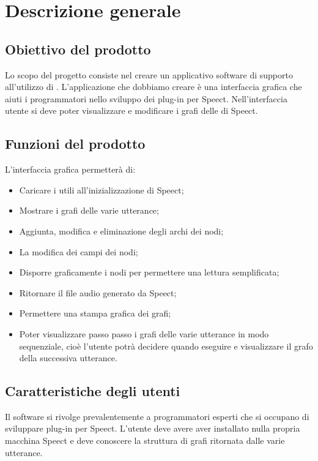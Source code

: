 \documentclass[../AnalisideiRequisiti.tex]{subfiles}
\begin{document}
	
\chapter{Descrizione generale}

\section{Obiettivo del prodotto}

Lo scopo del progetto consiste nel creare un applicativo software di supporto all’utilizzo di . L’applicazione che dobbiamo creare è una interfaccia grafica che aiuti i programmatori nello sviluppo dei plug-in per Speect. Nell’interfaccia utente si deve poter visualizzare e modificare i grafi delle  di Speect. 


\section{Funzioni del prodotto}
L’interfaccia grafica permetterà di:
\begin{itemize}
	\item{} Caricare i  utili all’inizializzazione di Speect;
	\item{} Mostrare i grafi delle varie utterance;
	\item{} Aggiunta, modifica e eliminazione degli archi dei nodi; 
	\item{} La modifica dei campi dei nodi;
	\item{} Disporre graficamente i nodi per permettere una lettura semplificata;
	\item{} Ritornare il file audio generato da Speect;
	\item{} Permettere una stampa grafica dei grafi;
	\item{} Poter visualizzare passo passo i grafi delle varie utterance in modo sequenziale, cioè l’utente potrà decidere quando eseguire e visualizzare il grafo della successiva utterance.	
\end{itemize}


\section{Caratteristiche degli utenti}
Il software si rivolge prevalentemente a programmatori esperti che si occupano di sviluppare plug-in per Speect. L’utente deve avere aver installato nulla propria macchina Speect e deve conoscere la struttura di grafi ritornata dalle varie utterance.
\end{document}
